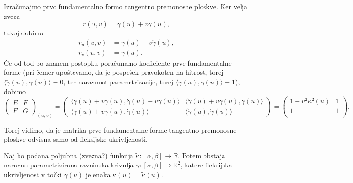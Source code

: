 Izračunajmo prvo fundamentalno formo tangentno premonosne ploskve. Ker velja zveza
\begin{equation*} r(u,v) = \gamma(u) + v \dot{\gamma}(u),\end{equation*}takoj dobimo 
\begin{align*}
    r_u(u,v) &= \dot{\gamma}(u) + v \ddot{\gamma}(u), \\
    r_v(u,v) &= \dot{\gamma}(u). 
\end{align*}
Če od tod po znanem postopku poračunamo koeficiente prve fundamentalne forme (pri čemer upoštevamo, da je pospešek pravokoten na hitrost, torej $ \langle \ddot{\gamma}(u) , \dot{\gamma}(u) \rangle = 0$, ter naravnost parametrizacije, torej $ \langle \dot{\gamma}(u) , \dot{\gamma}(u) \rangle = 1$), dobimo 
\begin{equation*} \begin{pmatrix}
E & F \\
F & G
\end{pmatrix}_{(u,v)} = \begin{pmatrix}
  \langle \dot{\gamma}(u) + v \ddot{\gamma}(u), \dot{\gamma}(u) + v \ddot{\gamma}(u) \rangle  & \langle \dot{\gamma}(u) + v \ddot{\gamma}(u), \dot{\gamma}(u) \rangle \\
  \langle \dot{\gamma}(u) + v \ddot{\gamma}(u), \dot{\gamma}(u) \rangle & \langle \dot{\gamma}(u), \dot{\gamma}(u) \rangle
  \end{pmatrix}= \begin{pmatrix}
  1 + v^2 \kappa^2(u) & 1\\
  1 & 1\\
\end{pmatrix}.\end{equation*}

Torej vidimo, da je matrika prve fundamentalne forme tangentno premonosne ploskve odvisna samo od fleksijske ukrivljenosti.

\begin{trditev}
\label{trd_obstoj_krivulje_glede_na_funkcijo_fleksijske_ukrivljenosti}
 Naj bo podana poljubna (zvezna?) funkcija $\tilde{\kappa}: [\alpha, \beta] \to  \mathbb{R}$. Potem obstaja naravno parametrizirana ravninska krivulja $\gamma: [\alpha, \beta] \to  \mathbb{R}^2$, katere fleksijska ukrivljenost v točki
  $\gamma(u)$ je enaka $\kappa(u) = \tilde{\kappa}(u)$.
\end{trditev}

